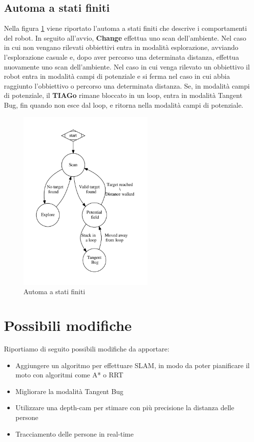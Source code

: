 \documentclass[a4paper]{article}
\begin{document}
	\subsection{Automa a stati finiti}\label{subsec:Pianificazione}
	
	Nella figura \ref{fig:fsa} viene riportato l'automa a stati finiti che
	descrive i comportamenti del robot. In seguito all'avvio, \textbf{Change}
	effettua uno scan dell'ambiente. Nel caso in cui non vengano rilevati
	obbiettivi entra in modalità esplorazione, avviando l'esplorazione casuale
	e, dopo aver percorso una determinata distanza, effettua nuovamente uno
	scan dell'ambiente. Nel caso in cui venga rilevato un obbiettivo il robot
	entra in modalità campi di potenziale e si ferma nel caso in cui abbia
	raggiunto l'obbiettivo o percorso una determinata distanza. Se, in modalità
	campi di potenziale, il \textbf{TIAGo} rimane bloccato in un loop, entra in
	modalità Tangent Bug, fin quando non esce dal loop, e ritorna nella
	modalità campi di potenziale.
	
	\begin{figure}[H]
		\centering
		\includegraphics[width=0.6\textwidth]{./img/fsa.pdf}
		\caption{Automa a stati finiti }
		\label{fig:fsa}
	\end{figure}
	
	\section{Possibili modifiche}\label{sec:Possibli-modifiche}
	Riportiamo di seguito possibili modifiche da apportare:
	\begin{itemize}
		\item Aggiungere un algoritmo per effettuare SLAM, in modo da poter
			pianificare il moto con algoritmi come A* \cite{A*} o RRT
			\cite{RRT}
		\item Migliorare la modalità Tangent Bug
		\item Utilizzare una depth-cam per stimare con più precisione la
			distanza delle persone
		\item Tracciamento delle persone in real-time
	\end{itemize}
\end{document}
